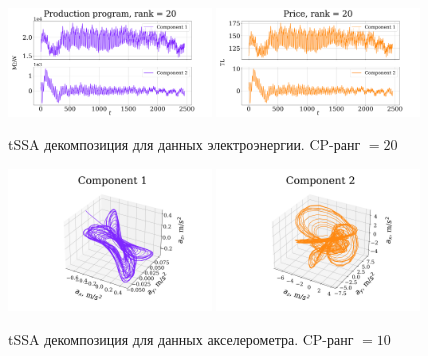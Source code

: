 			\begin{figure}[h]
				\centering
				\includegraphics[width=0.48\textwidth, keepaspectratio]{../experiments/electricity/tssa/figs/decomposition/cpd_rank_20/Production program.png}
				\includegraphics[width=0.48\textwidth, keepaspectratio]{../experiments/electricity/tssa/figs/decomposition/cpd_rank_20/Price.png}
				\caption{tSSA декомпозиция для данных электроэнергии. CP-ранг $ = 20 $}\label{fig:electr_decomp_tssa}
			\end{figure}
			
			\begin{figure}[h]
				\centering
				\includegraphics[width=0.48\textwidth, 	keepaspectratio]{../experiments/motion_1/tssa/figs/decomposition/cpd_rank_15/acceler_1.png}
				\includegraphics[width=0.48\textwidth, keepaspectratio]{../experiments/motion_1/tssa/figs/decomposition/cpd_rank_15/acceler_2.png}
			\caption{tSSA декомпозиция для данных акселерометра. CP-ранг $ = 10 $}\label{fig:accel_decomp_tssa}
			\end{figure}
			
